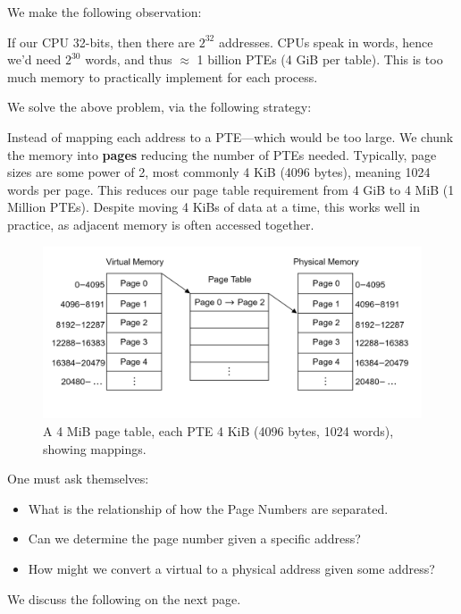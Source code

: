 \newpage 

\noindent
We make the following observation:
\begin{theo}

    If our CPU 32-bits, then there are $2^{32}$ addresses. CPUs speak in words, hence we'd need $2^{30}$ words, and thus $\approx$ 1 billion PTEs (4 GiB per table).
    This is too much memory to practically implement for each process.
\end{theo}

\noindent
We solve the above problem, via the following strategy:

\begin{Def}
    
    Instead of mapping each address to a PTE---which would be too large. We
    chunk the memory into \textbf{pages} reducing the number of PTEs needed. Typically, page sizes 
    are some power of 2, most commonly 4 KiB (4096 bytes), meaning 1024 words per page. This reduces our 
    page table requirement from 4 GiB to 4 MiB (1 Million PTEs). Despite moving 4 KiBs of data at a time, this works
    well in practice, as adjacent memory is often accessed together. 
\end{Def}

\begin{figure}[h]
    \centering
    \includegraphics[width=\textwidth]{Sections/virt/page.png}
    
    \vspace{1em}
    \caption{A 4 MiB page table, each PTE 4 KiB (4096 bytes, 1024 words), showing mappings.}
    
    \label{fig:virt4}
\end{figure}


\noindent
One must ask themselves:
\begin{itemize}
    \item What is the relationship of how the Page Numbers are separated.
    \item Can we determine the page number given a specific address?
    \item How might we convert a virtual to a physical address given some address?
\end{itemize}
\noindent
We discuss the following on the next page.

